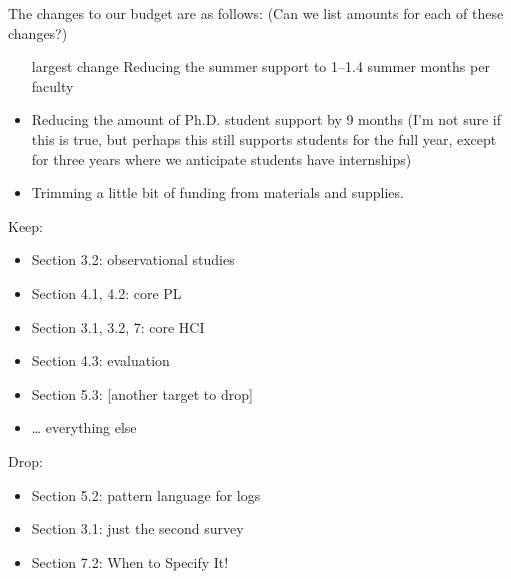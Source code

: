 The changes to our budget are as follows:
(Can we list amounts for each of these changes?)

\begin{itemize}
  \item [largest change] Reducing the summer support to 1--1.4 summer months per faculty
  \item Reducing the amount of Ph.D. student support by 9 months (I'm not sure
    if this is true, but perhaps this still supports students for the full
    year, except for three years where we anticipate students have internships)
  \item Trimming a little bit of funding from materials and supplies.
\end{itemize}

Keep:

\begin{itemize}
  \item Section 3.2: observational studies
  \item Section 4.1, 4.2: core PL
  \item Section 3.1, 3.2, 7: core HCI
  \item Section 4.3: evaluation
  \item Section 5.3: [another target to drop]
  \item \ldots{} everything else
\end{itemize}

Drop:

\begin{itemize}
  \item Section 5.2: pattern language for logs
  \item Section 3.1: just the second survey
  \item Section 7.2: When to Specify It!
\end{itemize}
